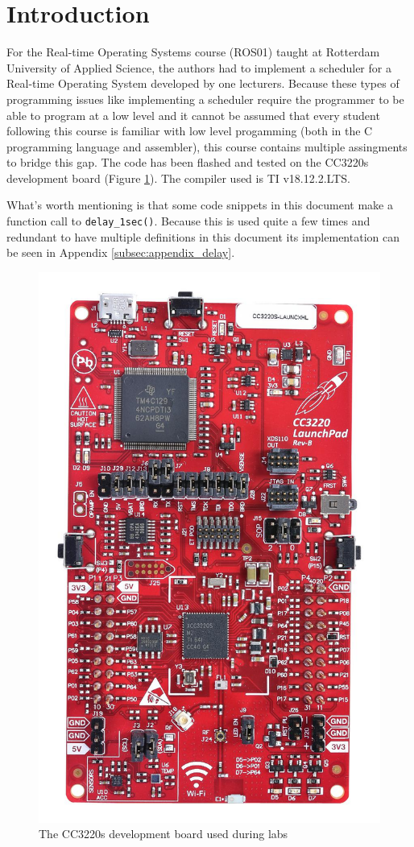 \section{Introduction}

For the Real-time Operating Systems course (ROS01) taught at Rotterdam University of Applied Science,
the authors had to implement a scheduler for a Real-time Operating System developed by one lecturers.
Because these types of programming issues like implementing a scheduler require the programmer to be able to program at a low level and it cannot be assumed that every student following this course is familiar with low level progamming (both in the C programming language and assembler), this course contains multiple assingments to bridge this gap.
The code has been flashed and tested on the CC3220s development board (Figure \ref{fig:cc3220s}). The compiler used is TI v18.12.2.LTS.

What's worth mentioning is that some code snippets in this document make a function call to \texttt{delay\_1sec()}.
Because this is used quite a few times and redundant to have multiple definitions in this document its implementation can be seen in Appendix \ref{subsec:appendix_delay}.


\begin{figure}[H]
    \centering

    \includegraphics[angle=90,scale=0.2]{img/cc3220s.jpg}

    \caption{The CC3220s development board used during labs}
    \label{fig:cc3220s}

\end{figure}
